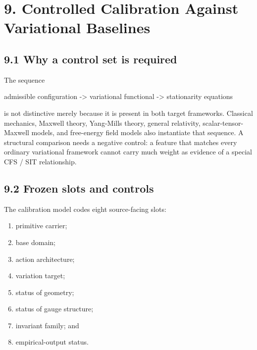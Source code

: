 \documentclass[
  american,
  11pt,
  letterpaper,
]{article}
\newenvironment{Shaded}{}{}
\newcommand{\NormalTok}[1]{#1}
\providecommand{\tightlist}{%
  \setlength{\itemsep}{0pt}\setlength{\parskip}{0pt}}
\begin{document}
\section{9. Controlled Calibration Against Variational Baselines}\label{controlled-calibration-against-variational-baselines}

\subsection{9.1 Why a control set is required}\label{why-a-control-set-is-required}

The sequence

\begin{Shaded}
\begin{Highlighting}[]
\NormalTok{admissible configuration {-}\textgreater{} variational functional {-}\textgreater{} stationarity equations}
\end{Highlighting}
\end{Shaded}

is not distinctive merely because it is present in both target frameworks. Classical mechanics, Maxwell theory, Yang-Mills theory, general relativity, scalar-tensor-Maxwell models, and free-energy field models also instantiate that sequence. A structural comparison needs a negative control: a feature that matches every ordinary variational framework cannot carry much weight as evidence of a special CFS / SIT relationship.

\subsection{9.2 Frozen slots and controls}\label{frozen-slots-and-controls}

The calibration model codes eight source-facing slots:

\begin{enumerate}
\def\labelenumi{\arabic{enumi}.}
\tightlist
\item
  primitive carrier;
\item
  base domain;
\item
  action architecture;
\item
  variation target;
\item
  status of geometry;
\item
  status of gauge structure;
\item
  invariant family; and
\item
  empirical-output status.
\end{enumerate}
\end{document}
